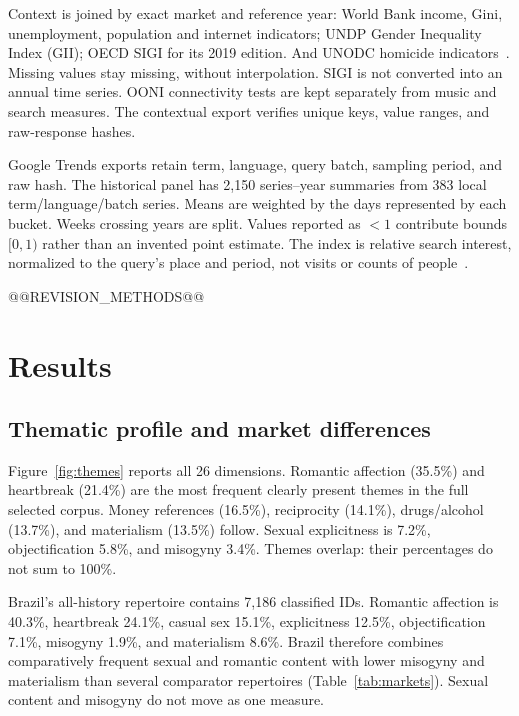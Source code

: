 \documentclass[10pt,a4paper,twocolumn]{article}
\begin{document}
Context is joined by exact market and reference year: World Bank income, Gini, unemployment, population and internet indicators; UNDP Gender Inequality Index (GII); OECD SIGI for its 2019 edition. And UNODC homicide indicators~\cite{wdi,gii,sigi,homicide}. Missing values stay missing, without interpolation. SIGI is not converted into an annual time series. OONI connectivity tests are kept separately from music and search measures. The contextual export verifies unique keys, value ranges, and raw-response hashes.

Google Trends exports retain term, language, query batch, sampling period, and raw hash. The historical panel has 2,150 series--year summaries from 383 local term/language/batch series. Means are weighted by the days represented by each bucket. Weeks crossing years are split. Values reported as $<1$ contribute bounds $[0,1)$ rather than an invented point estimate. The index is relative search interest, normalized to the query's place and period, not visits or counts of people~\cite{trends}.

@@REVISION_METHODS@@

\section{Results}
\subsection{Thematic profile and market differences}
Figure~\ref{fig:themes} reports all 26 dimensions. Romantic affection (35.5\%) and heartbreak (21.4\%) are the most frequent clearly present themes in the full selected corpus. Money references (16.5\%), reciprocity (14.1\%), drugs/alcohol (13.7\%), and materialism (13.5\%) follow. Sexual explicitness is 7.2\%, objectification 5.8\%, and misogyny 3.4\%. Themes overlap: their percentages do not sum to 100\%.

Brazil's all-history repertoire contains 7,186 classified IDs. Romantic affection is 40.3\%, heartbreak 24.1\%, casual sex 15.1\%, explicitness 12.5\%, objectification 7.1\%, misogyny 1.9\%, and materialism 8.6\%. Brazil therefore combines comparatively frequent sexual and romantic content with lower misogyny and materialism than several comparator repertoires (Table~\ref{tab:markets}). Sexual content and misogyny do not move as one measure.
\end{document}

